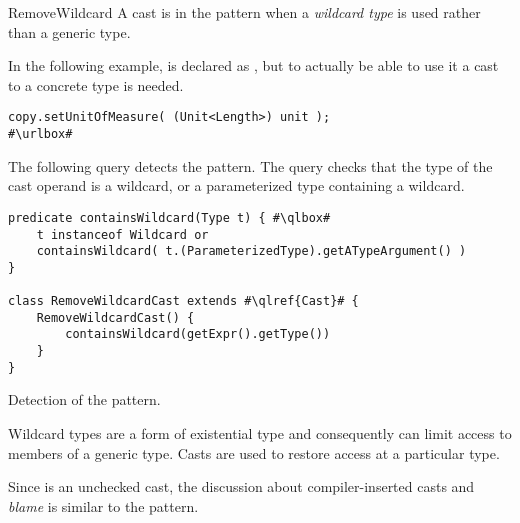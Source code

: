 \begin{pattern}{RemoveWildcard}
A cast is in the \thisp{} pattern when a \emph{wildcard type} is used rather than a generic type.


\instances{}
In the following example,%
\def\urlvar{http://bit.ly/eclipse_jetty_project_2WMI0Ld}
 is declared as ,
but to actually be able to use it a cast to a concrete type is needed.

\begin{verbatim}
copy.setUnitOfMeasure( (Unit<Length>) unit );
#\urlbox#
\end{verbatim}


\detection{}
The following query detects the \thisp{} pattern.
The query checks that the type of the cast operand is a wildcard,
or a parameterized type containing a wildcard.

\begin{listing}
\begin{verbatim}
predicate containsWildcard(Type t) { #\qlbox#
	t instanceof Wildcard or
	containsWildcard( t.(ParameterizedType).getATypeArgument() )
}

class RemoveWildcardCast extends #\qlref{Cast}# {
	RemoveWildcardCast() {
		containsWildcard(getExpr().getType())
	}
}
\end{verbatim}
\caption{Detection of the \thisp{} pattern.}
\label{lst:ql:RemoveWildcardCast}
\end{listing}


\issues{}
Wildcard types are a form of existential type and consequently can limit
access to members of a generic type.
Casts are used to restore access at a particular type.

Since \thisp{} is an unchecked cast,
the discussion about compiler-inserted casts and \emph{blame} is similar to the  pattern.

\end{pattern}

